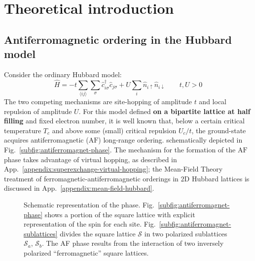\chapter{Theoretical introduction}\label{chapter:theoretical-introduction}

\todo

\section{Antiferromagnetic ordering in the Hubbard model}\label{sec:antiferromagnetic-ordering-hubbard}

Consider the ordinary Hubbard model:
\begin{equation}\label{eq:hubbard-model}
	\hat H = 
	-t \sum_{\langle ij \rangle} \sum_\sigma \hat c_{i\sigma}^\dagger \hat c_{j\sigma}
	+ U \sum_i \hat n_{i\uparrow} \hat n_{i\downarrow}
	\qquad
	t, U  > 0
\end{equation}
The two competing mechanisms are site-hopping of amplitude $t$ and local repulsion of amplitude $U$. For this model defined \textbf{on a bipartite lattice at half filling} and fixed electron number, it is well known \cite{hirsch1985hubbard} that, below a certain critical temperature $T_c$ and above some (small) critical repulsion $U_c/t$, the ground-state acquires antiferromagnetic ($\mathrm{AF}$) long-range ordering. schematically depicted in Fig.~\ref{subfig:antiferromagnet-phase}. The mechanism for the formation of the $\mathrm{AF}$ phase takes advantage of virtual hopping, as described in App.~\ref{appendix:superexchange-virtual-hopping}; the Mean-Field Theory treatment of ferromagnetic-antiferromagnetic orderings in $2\mathrm{D}$ Hubbard lattices is discussed in  App.~\ref{appendix:mean-field-hubbard}.

\begin{figure}
	\centering
	\hfil
	\caption{Schematic representation of the \AF phase. Fig.~\ref{subfig:antiferromagnet-phase} shows a portion of the square lattice with explicit representation of the spin for each site. Fig.~\ref{subfig:antiferromagnet-sublattices} divides the square lattice $\mathcal{S}$ in two polarized sublattices $\mathcal{S}_a$, $\mathcal{S}_b$. The AF phase results from the interaction of two inversely polarized ``ferromagnetic'' square lattices.}
	\label{fig:antiferromagnet-schemes}
\end{figure}

